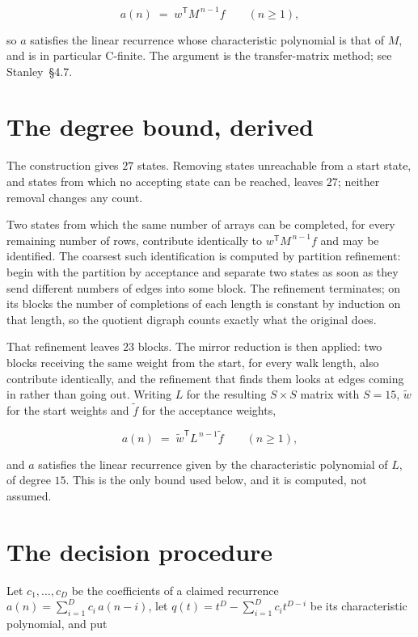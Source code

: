 \documentclass[11pt]{article}
\theoremstyle{definition}
\begin{document}
\[a(n) \;=\; w^{\mathsf T} M^{\,n-1} f \qquad (n \ge 1),\]

so $a$ satisfies the linear recurrence whose characteristic polynomial is that of $M$, and is in particular C-finite. The argument is the transfer-matrix method; see Stanley~\S4.7.

\section{The degree bound, derived}

The construction gives $27$ states. Removing states unreachable from a start state, and states from which no accepting state can be reached, leaves $27$; neither removal changes any count.

Two states from which the same number of arrays can be completed, for every remaining number of rows, contribute identically to $w^{\mathsf T}M^{\,n-1}f$ and may be identified. The coarsest such identification is computed by partition refinement: begin with the partition by acceptance and separate two states as soon as they send different numbers of edges into some block. The refinement terminates; on its blocks the number of completions of each length is constant by induction on that length, so the quotient digraph counts exactly what the original does.

That refinement leaves $23$ blocks. The mirror reduction is then applied: two blocks receiving the same weight from the start, for every walk length, also contribute identically, and the refinement that finds them looks at edges coming in rather than going out. Writing $L$ for the resulting $S \times S$ matrix with $S = 15$, $\tilde w$ for the start weights and $\tilde f$ for the acceptance weights,

\[a(n) \;=\; \tilde w^{\mathsf T} L^{\,n-1} \tilde f \qquad (n \ge 1),\]

and $a$ satisfies the linear recurrence given by the characteristic polynomial of $L$, of degree $15$. This is the only bound used below, and it is computed, not assumed.

\section{The decision procedure}

Let $c_1,\dots,c_D$ be the coefficients of a claimed recurrence $a(n) = \sum_{i=1}^{D} c_i\,a(n-i)$, let $q(t) = t^{D} - \sum_{i=1}^{D} c_i t^{D-i}$ be its characteristic polynomial, and put
\end{document}
